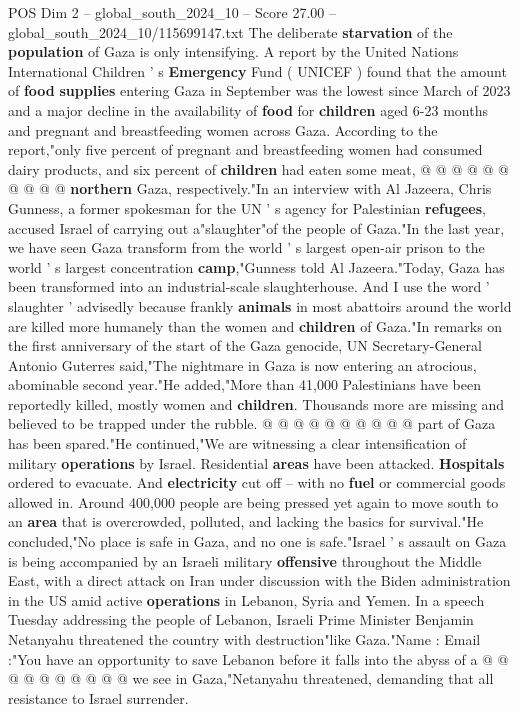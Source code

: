 \begin{textsample}{POS Dim 2 – global\_south\_2024\_10 – Score 27.00 – global\_south\_2024\_10/115699147.txt}
The deliberate \textbf{starvation} of the \textbf{population} of Gaza is only intensifying.
A report by the United Nations International Children ' s \textbf{Emergency} Fund ( UNICEF ) found that the amount of \textbf{food} \textbf{supplies} entering Gaza in September was the lowest since March of 2023 and a major decline in the availability of \textbf{food} for \textbf{children} aged 6-23 months and pregnant and breastfeeding women across Gaza.
According to the report,"only five percent of pregnant and breastfeeding women had consumed dairy products, and six percent of \textbf{children} had eaten some meat, @ @ @ @ @ @ @ @ @ @ \textbf{northern} Gaza, respectively."In an interview with Al Jazeera, Chris Gunness, a former spokesman for the UN ' s agency for Palestinian \textbf{refugees}, accused Israel of carrying out a"slaughter"of the people of Gaza."In the last year, we have seen Gaza transform from the world ' s largest open-air prison to the world ' s largest concentration \textbf{camp},"Gunness told Al Jazeera."Today, Gaza has been transformed into an industrial-scale slaughterhouse.
And I use the word ' slaughter ' advisedly because frankly \textbf{animals} in most abattoirs around the world are killed more humanely than the women and \textbf{children} of Gaza."In remarks on the first anniversary of the start of the Gaza genocide, UN Secretary-General Antonio Guterres said,"The nightmare in Gaza is now entering an atrocious, abominable second year."He added,"More than 41,000 Palestinians have been reportedly killed, mostly women and \textbf{children}.
Thousands more are missing and believed to be trapped under the rubble. @ @ @ @ @ @ @ @ @ @ part of Gaza has been spared."He continued,"We are witnessing a clear intensification of military \textbf{operations} by Israel.
Residential \textbf{areas} have been attacked. \textbf{Hospitals} ordered to evacuate.
And \textbf{electricity} cut off -- with no \textbf{fuel} or commercial goods allowed in.
Around 400,000 people are being pressed yet again to move south to an \textbf{area} that is overcrowded, polluted, and lacking the basics for survival."He concluded,"No place is safe in Gaza, and no one is safe."Israel ' s assault on Gaza is being accompanied by an Israeli military \textbf{offensive} throughout the Middle East, with a direct attack on Iran under discussion with the Biden administration in the US amid active \textbf{operations} in Lebanon, Syria and Yemen.
In a speech Tuesday addressing the people of Lebanon, Israeli Prime Minister Benjamin Netanyahu threatened the country with destruction"like Gaza."Name : Email :"You have an opportunity to save Lebanon before it falls into the abyss of a @ @ @ @ @ @ @ @ @ @ we see in Gaza,"Netanyahu threatened, demanding that all resistance to Israel surrender.

\end{textsample}
